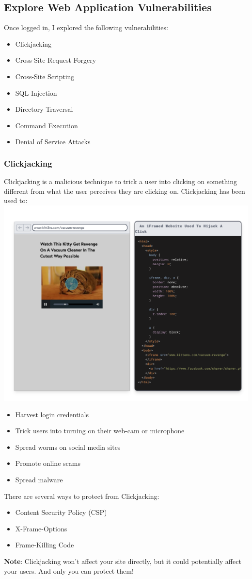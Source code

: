 \documentclass[12pt]{article}
\newcommand{\note}[1]{\textbf{#1}} %
\begin{document}
\subsection{Explore Web Application Vulnerabilities}

Once logged in, I explored the following vulnerabilities:

\begin{itemize}
    \item Clickjacking
    \item Cross-Site Request Forgery
    \item Cross-Site Scripting
    \item SQL Injection
    \item Directory Traversal
    \item Command Execution
    \item Denial of Service Attacks
\end{itemize}

\newpage

\subsubsection{Clickjacking}
Clickjacking is a malicious technique to trick a user into clicking on something different from what the user perceives they are clicking on. Clickjacking has been used to: \\
\includegraphics[width=.7\textwidth]{Image15.png} 
\begin{itemize}
    \item Harvest login credentials
    \item Trick users into turning on their web-cam or microphone
    \item Spread worms on social media sites
    \item Promote online scams
    \item Spread malware
\end{itemize}
There are several ways to protect from Clickjacking:
\begin{itemize}
    \item Content Security Policy (CSP)
    \item X-Frame-Options
    \item Frame-Killing Code
\end{itemize}
\note{Note}: Clickjacking won't affect your site directly, but it could potentially affect your users. And only you can protect them! \\
\end{document}
